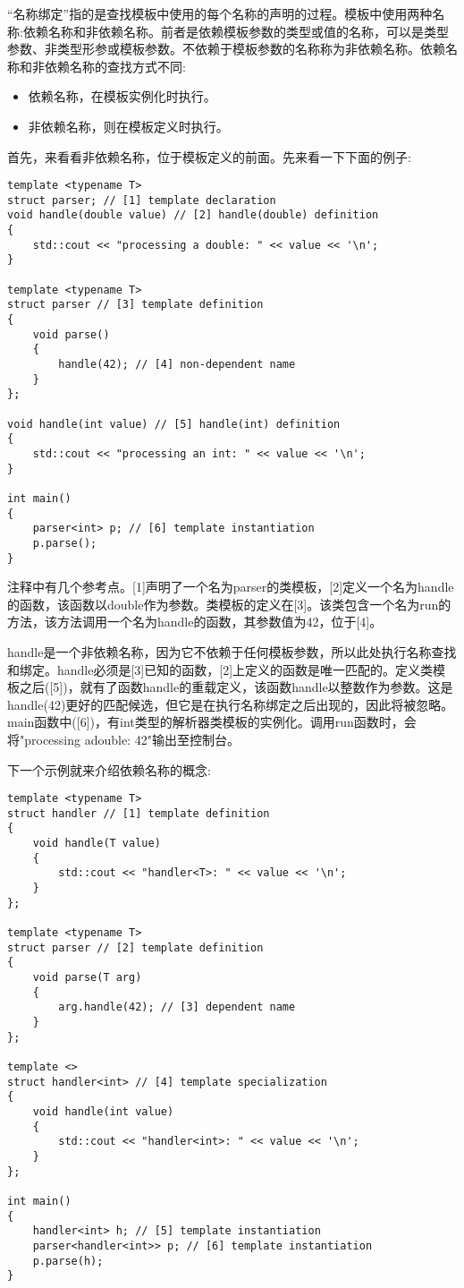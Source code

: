 
“名称绑定”指的是查找模板中使用的每个名称的声明的过程。模板中使用两种名称:依赖名称和非依赖名称。前者是依赖模板参数的类型或值的名称，可以是类型参数、非类型形参或模板参数。不依赖于模板参数的名称称为非依赖名称。依赖名称和非依赖名称的查找方式不同:

\begin{itemize}
\item
依赖名称，在模板实例化时执行。

\item
非依赖名称，则在模板定义时执行。
\end{itemize}

首先，来看看非依赖名称，位于模板定义的前面。先来看一下下面的例子:

\begin{lstlisting}[style=styleCXX]
template <typename T>
struct parser; // [1] template declaration
void handle(double value) // [2] handle(double) definition
{
	std::cout << "processing a double: " << value << '\n';
}

template <typename T>
struct parser // [3] template definition
{
	void parse()
	{
		handle(42); // [4] non-dependent name
	}
};

void handle(int value) // [5] handle(int) definition
{
	std::cout << "processing an int: " << value << '\n';
}

int main()
{
	parser<int> p; // [6] template instantiation
	p.parse();
}
\end{lstlisting}

注释中有几个参考点。[1]声明了一个名为parser的类模板，[2]定义一个名为handle的函数，该函数以double作为参数。类模板的定义在[3]。该类包含一个名为run的方法，该方法调用一个名为handle的函数，其参数值为42，位于[4]。

handle是一个非依赖名称，因为它不依赖于任何模板参数，所以此处执行名称查找和绑定。handle必须是[3]已知的函数，[2]上定义的函数是唯一匹配的。定义类模板之后([5])，就有了函数handle的重载定义，该函数handle以整数作为参数。这是handle(42)更好的匹配候选，但它是在执行名称绑定之后出现的，因此将被忽略。main函数中([6])，有int类型的解析器类模板的实例化。调用run函数时，会将"processing adouble: 42"输出至控制台。

下一个示例就来介绍依赖名称的概念:

\begin{lstlisting}[style=styleCXX]
template <typename T>
struct handler // [1] template definition
{
	void handle(T value)
	{
		std::cout << "handler<T>: " << value << '\n';
	}
};

template <typename T>
struct parser // [2] template definition
{
	void parse(T arg)
	{
		arg.handle(42); // [3] dependent name
	}
};

template <>
struct handler<int> // [4] template specialization
{
	void handle(int value)
	{
		std::cout << "handler<int>: " << value << '\n';
	}
};

int main()
{
	handler<int> h; // [5] template instantiation
	parser<handler<int>> p; // [6] template instantiation
	p.parse(h);
}
\end{lstlisting}

